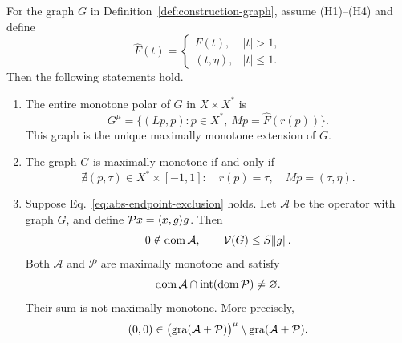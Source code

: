 \begin{theorem}
\label{thm:endpoint-criterion}
For the graph $G$ in Definition~\ref{def:construction-graph},
assume \textup{(H1)--(H4)} and define
\[
\widehat F(t)=
\begin{cases}
F(t),&|t|>1,\\
(t,\eta),&|t|\le1.
\end{cases}
\]
Then the following statements hold.
\begin{enumerate}
\item[(i)] The entire monotone polar of $G$ in $X\times X^*$ is
\begin{equation}
G^\mu=\{(Lp,p):p\in X^*,\ Mp=\widehat F(r(p))\}.
\label{eq:abs-entire-polar}
\end{equation}
This graph is the unique maximally monotone extension of $G$.

\item[(ii)] The graph $G$ is maximally monotone if and only if
\begin{equation}
\nexists(p,\tau)\in X^*\times[-1,1]:
\quad r(p)=\tau,\quad Mp=(\tau,\eta).
\label{eq:abs-endpoint-exclusion}
\end{equation}

\item[(iii)] Suppose Eq.~\eqref{eq:abs-endpoint-exclusion} holds.
Let $\mathcal A$ be the operator with graph $G$, and define
$\mathcal P x=\langle x,g\rangle g$. Then
\[
0\notin\operatorname{dom}\mathcal A,\qquad \mathcal V(G)\le S\|g\|.
\]
Both $\mathcal A$ and $\mathcal P$ are maximally monotone and satisfy
\[
\operatorname{dom}\mathcal A\cap\operatorname{int}(\operatorname{dom}\mathcal P)\ne\varnothing.
\]
Their sum is not maximally monotone. More precisely,
\[
(0,0)\in
\bigl(\operatorname{gra}(\mathcal A+\mathcal P)\bigr)^\mu
\setminus\operatorname{gra}(\mathcal A+\mathcal P).
\]
\end{enumerate}
\end{theorem}
